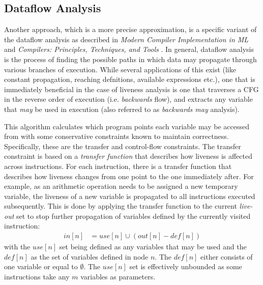 \documentclass{article}
\begin{document}
\subsection{Dataflow Analysis}


Another approach, which is a more precise approximation, is a specific variant of the dataflow analysis as described in \textit{Modern Compiler Implementation in ML} \cite{tiger} and \textit{Compilers: Principles, Techniques, and Tools} \cite{dragon}. In general, dataflow analysis is the process of finding the possible paths in which data may propagate through various branches of execution.  While several applications of this exist (like constant propagation, reaching defnitions, available expressions etc.), one that is immediately beneficial in the case of liveness analysis is one that traverses a CFG in the reverse order of execution (i.e.  \textit{backwards} flow), and extracts any variable that \textit{may} be used in execution (also referred to as \textit{backwards may} analysis). %

This algorithm calculates which program points each variable may be accessed from with some conservative constraints known to maintain correctness. Specifically, these are the transfer and control-flow constraints. %
The transfer constraint is based on a \textit{transfer function} \cite[599]{dragon} that describes how liveness is affected across instructions. For each instruction, there is a transfer function that describes how liveness changes from one point to the one immediately after. For example, as an arithmetic operation needs to be assigned a new temporary variable, the liveness of a new variable is propagated to all  instructions  executed subsequently. This is done by applying the transfer function to the current \textit{live-out} set to stop further propagation of variables defined by the currently visited instruction: %
\begin{align}\label{flowin}
  \mathit{in}\left[n\right] &= \mathit{use}\left[n\right] \cup (\mathit{out}\left[n\right] - \mathit{def}\left[n\right])
\end{align}
with the \(\mathit{use}[n]\) set being defined as any variables that may be used and the \(\mathit{def}[n]\) as the set of variables defined in node \(n\). The \(\mathit{def}[n]\) either consists of one variable or equal to \(\emptyset\). The  \(\mathit{use}[n]\) set is effectively unbounded as some instructions take any \(m\) variables as parameters.
\end{document}
